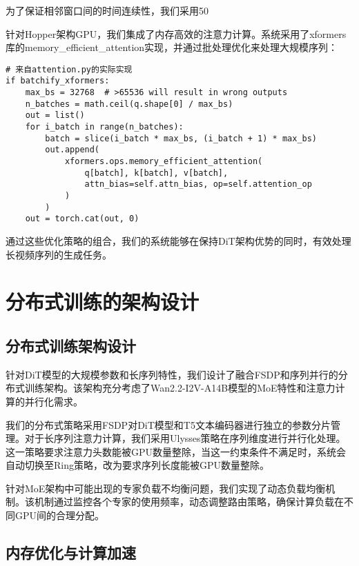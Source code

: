 为了保证相邻窗口间的时间连续性，我们采用50%

针对Hopper架构GPU，我们集成了内存高效的注意力计算。系统采用了xformers库的memory\_efficient\_attention实现，并通过批处理优化来处理大规模序列：

\begin{verbatim}
# 来自attention.py的实际实现
if batchify_xformers:
    max_bs = 32768  # >65536 will result in wrong outputs
    n_batches = math.ceil(q.shape[0] / max_bs)
    out = list()
    for i_batch in range(n_batches):
        batch = slice(i_batch * max_bs, (i_batch + 1) * max_bs)
        out.append(
            xformers.ops.memory_efficient_attention(
                q[batch], k[batch], v[batch],
                attn_bias=self.attn_bias, op=self.attention_op
            )
        )
    out = torch.cat(out, 0)
\end{verbatim}

通过这些优化策略的组合，我们的系统能够在保持DiT架构优势的同时，有效处理长视频序列的生成任务。

\section{分布式训练的架构设计}

\subsection{分布式训练架构设计}

针对DiT模型的大规模参数和长序列特性，我们设计了融合FSDP和序列并行的分布式训练架构。该架构充分考虑了Wan2.2-I2V-A14B模型的MoE特性和注意力计算的并行化需求。

我们的分布式策略采用FSDP对DiT模型和T5文本编码器进行独立的参数分片管理。对于长序列注意力计算，我们采用Ulysses策略在序列维度进行并行化处理。这一策略要求注意力头数能被GPU数量整除，当这一约束条件不满足时，系统会自动切换至Ring策略，改为要求序列长度能被GPU数量整除。

针对MoE架构中可能出现的专家负载不均衡问题，我们实现了动态负载均衡机制。该机制通过监控各个专家的使用频率，动态调整路由策略，确保计算负载在不同GPU间的合理分配。

\subsection{内存优化与计算加速}

